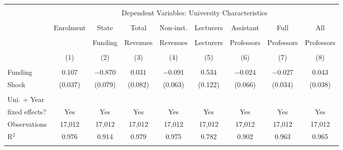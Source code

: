 
\begin{tabular}{@{\extracolsep{5pt}}lcccccccc} 
\\[-1.8ex]\hline 
\hline \\[-1.8ex] 
 & \multicolumn{8}{c}{Dependent Variables: University Characteristics} \\ 
\cline{2-9} 
\\[-1.8ex] & Enrolment & State & Total & Non-inst. & Lecturers & Assistant & Full & All \\ 
\\[-1.8ex] &           & Funding & Revenues & Revenues & Lecturers & Professors & Professors & Professors \\ 
\\[-1.8ex] & (1) & (2) & (3) & (4) & (5) & (6) & (7) & (8)\\ 
\hline \\[-1.8ex] 
 Funding & 0.107 & $-$0.870 & 0.031 & $-$0.091 & 0.534 & $-$0.024 & $-$0.027 & 0.043 \\ 
 Shock   & (0.037) & (0.079) & (0.082) & (0.063) & (0.122) & (0.066) & (0.034) & (0.038) \\ 
\hline \\[-1.8ex] 
 Uni. + Year \\
 fixed effects? & Yes & Yes & Yes & Yes & Yes & Yes & Yes & Yes \\
Observations & 17,012 & 17,012 & 17,012 & 17,012 & 17,012 & 17,012 & 17,012 & 17,012 \\ 
R$^{2}$ & 0.976 & 0.914 & 0.979 & 0.975 & 0.782 & 0.902 & 0.963 & 0.965 \\ 
\hline 
\hline \\[-1.8ex] 
\end{tabular} 

